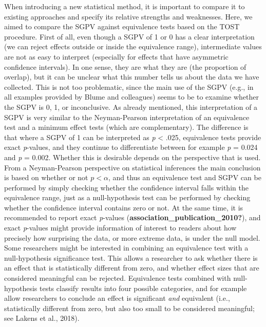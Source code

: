 \documentclass[
  english,
  man]{apa6}
\begin{document}
When introducing a new statistical method, it is important to compare it to existing approaches and specify its relative strengths and weaknesses. Here, we aimed to compare the SGPV against equivalence tests based on the TOST procedure. First of all, even though a SGPV of 1 or 0 has a clear interpretation (we can reject effects outside or inside the equivalence range), intermediate values are not as easy to interpret (especially for effects that have asymmetric confidence intervals). In one sense, they are what they are (the proportion of overlap), but it can be unclear what this number tells us about the data we have collected. This is not too problematic, since the main use of the SGPV (e.g., in all examples provided by Blume and colleagues) seems to be to examine whether the SGPV is 0, 1, or inconclusive. As already mentioned, this interpretation of a SGPV is very similar to the Neyman-Pearson interpretation of an equivalence test and a minimum effect tests (which are complementary). The difference is that where a SGPV of 1 can be interpreted as \emph{p} \textless{} .025, equivalence tests provide exact \emph{p}-values, and they continue to differentiate between for example \emph{p} = 0.024 and \emph{p} = 0.002. Whether this is desirable depends on the perspective that is used. From a Neyman-Pearson perspective on statistical inferences the main conclusion is based on whether or not \(p < \alpha\), and thus an equivalence test and SGPV can be performed by simply checking whether the confidence interval falls within the equivalence range, just as a null-hypothesis test can be performed by checking whether the confidence interval contains zero or not. At the same time, it is recommended to report exact \emph{p}-values (\textbf{association\_publication\_2010?}), and exact \emph{p}-values might provide information of interest to readers about how precisely how surprising the data, or more extreme data, is under the null model. Some researchers might be interested in combining an equivalence test with a null-hypothesis significance test. This allows a researcher to ask whether there is an effect that is statistically different from zero, and whether effect sizes that are considered meaningful can be rejected. Equivalence tests combined with null-hypothesis tests classify results into four possible categories, and for example allow researchers to conclude an effect is significant \emph{and} equivalent (i.e., statistically different from zero, but also too small to be considered meaningful; see Lakens et al., 2018).
\end{document}
